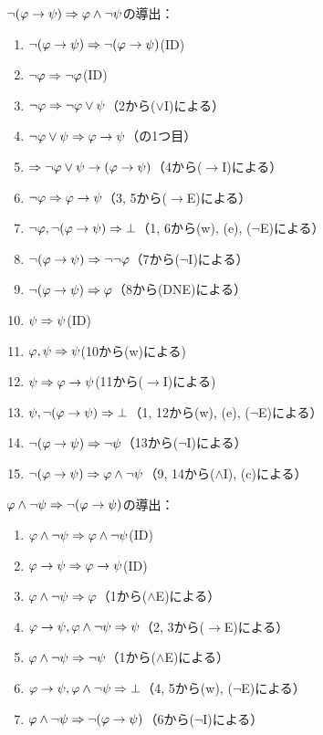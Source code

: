 \(\lnot \paren{\varphi \to \psi} \sequent \varphi \land \lnot \psi\)の導出：
\begin{enumerate}
	\item \(\lnot \paren{\varphi \to \psi} \sequent \lnot \paren{\varphi \to \psi}\)\quad (ID)
	\item \(\lnot \varphi \Rightarrow \lnot \varphi\)\quad (ID)
	\item \(\lnot \varphi \Rightarrow \lnot \varphi \lor \psi\)\quad （2から(\(\lor\)I)による）
	\item \(\lnot \varphi \lor \psi \Rightarrow \varphi \to \psi\)\quad （の1つ目）
	\item \(\sequent \lnot \varphi \lor \psi \to \paren{\varphi \to \psi}\)\quad （4から(\(\to\)I)による）
	\item \(\lnot \varphi \Rightarrow \varphi \to \psi\)\quad （3, 5から(\(\to\)E)による）
	\item \(\lnot \varphi, \lnot \paren{\varphi \to \psi} \sequent \bot\)\quad （1, 6から(w), (e), (\(\lnot\)E)による）
	\item \(\lnot \paren{\varphi \to \psi} \sequent \lnot \lnot \varphi\)\quad （7から(\(\lnot\)I)による）
	\item \(\lnot \paren{\varphi \to \psi} \sequent \varphi\)\quad （8から(DNE)による）
	\item \(\psi \Rightarrow \psi\)\quad (ID)
	\item \(\varphi, \psi \Rightarrow \psi\)\quad (10から(w)による)
	\item \(\psi \Rightarrow \varphi \to \psi\)\quad (11から(\(\to\)I)による)
	\item \(\psi, \lnot \paren{\varphi \to \psi} \sequent \bot\)\quad （1, 12から(w), (e), (\(\lnot\)E)による）
	\item \(\lnot \paren{\varphi \to \psi} \sequent \lnot \psi\)\quad （13から(\(\lnot\)I)による）
	\item \(\lnot \paren{\varphi \to \psi} \sequent \varphi \land \lnot \psi\)\quad （9, 14から(\(\land\)I), (c)による）
\end{enumerate}

\(\varphi \land \lnot \psi \sequent \lnot \paren{\varphi \to \psi}\)の導出：
\begin{enumerate}
	\item \(\varphi \land \lnot \psi \Rightarrow \varphi \land \lnot \psi\)\quad (ID)
	\item \(\varphi \to \psi \Rightarrow \varphi \to \psi\)\quad (ID)
	\item \(\varphi \land \lnot \psi \Rightarrow \varphi\)\quad （1から(\(\land\)E)による）
	\item \(\varphi \to \psi, \varphi \land \lnot \psi \Rightarrow \psi\)\quad （2, 3から(\(\to\)E)による）
	\item \(\varphi \land \lnot \psi \Rightarrow \lnot \psi\)\quad （1から(\(\land\)E)による）
	\item \(\varphi \to \psi, \varphi \land \lnot \psi \Rightarrow \bot\)\quad （4, 5から(w), (\(\lnot\)E)による）
	\item \(\varphi \land \lnot \psi \sequent \lnot \paren{\varphi \to \psi}\)\quad （6から(\(\lnot\)I)による）
\end{enumerate}


